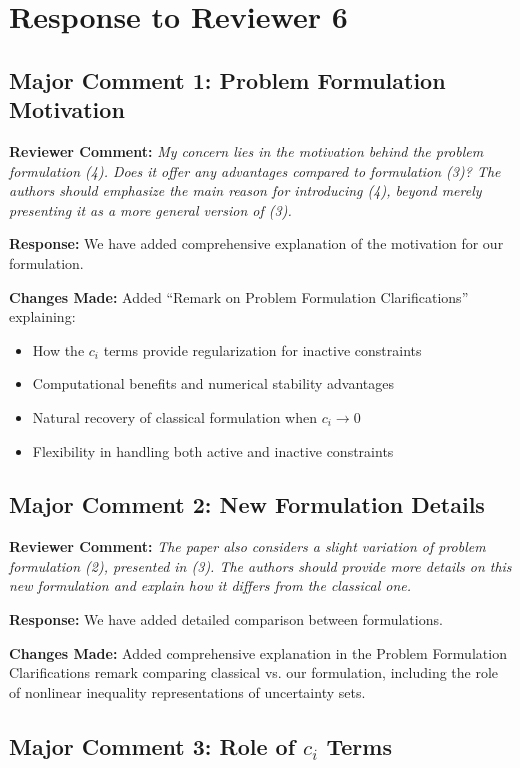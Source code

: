 \documentclass[11pt]{article}
\newcommand{\reviewercomment}[1]{\textbf{Reviewer Comment:} \textit{#1}}
\newcommand{\response}[1]{\textbf{Response:} #1}
\newcommand{\changes}[1]{\textbf{Changes Made:} #1}
\begin{document}
\section*{Response to Reviewer 6}

\subsection*{Major Comment 1: Problem Formulation Motivation}

\reviewercomment{My concern lies in the motivation behind the problem formulation (4). Does it offer any advantages compared to formulation (3)? The authors should emphasize the main reason for introducing (4), beyond merely presenting it as a more general version of (3).}

\response{We have added comprehensive explanation of the motivation for our formulation.}

\changes{Added ``Remark on Problem Formulation Clarifications'' explaining:
\begin{itemize}
\item How the $c_i$ terms provide regularization for inactive constraints
\item Computational benefits and numerical stability advantages
\item Natural recovery of classical formulation when $c_i \to 0$
\item Flexibility in handling both active and inactive constraints
\end{itemize}
}

\subsection*{Major Comment 2: New Formulation Details}

\reviewercomment{The paper also considers a slight variation of problem formulation (2), presented in (3). The authors should provide more details on this new formulation and explain how it differs from the classical one.}

\response{We have added detailed comparison between formulations.}

\changes{Added comprehensive explanation in the Problem Formulation Clarifications remark comparing classical vs. our formulation, including the role of nonlinear inequality representations of uncertainty sets.}

\subsection*{Major Comment 3: Role of $c_i$ Terms}
\end{document}
